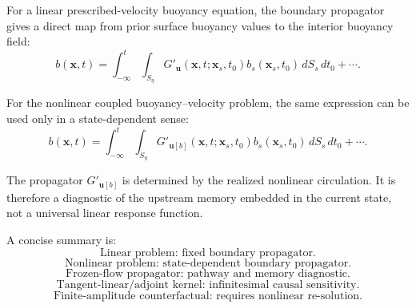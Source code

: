 \documentclass[10pt]{amsart}
\begin{document}
For a linear prescribed-velocity buoyancy equation, the boundary propagator gives a direct map from prior surface buoyancy values to the interior buoyancy field:
\begin{equation}
b(\mathbf x,t)
=
\int_{-\infty}^{t}\int_{S_\eta}
G'_{\mathbf u}(\mathbf x,t;\mathbf x_s,t_0)
b_s(\mathbf x_s,t_0)
\,dS_s\,dt_0
+\cdots.
\end{equation}

For the nonlinear coupled buoyancy--velocity problem, the same expression can be used only in a state-dependent sense:
\begin{equation}
b(\mathbf x,t)
=
\int_{-\infty}^{t}\int_{S_\eta}
G'_{\mathbf u[b]}(\mathbf x,t;\mathbf x_s,t_0)
b_s(\mathbf x_s,t_0)
\,dS_s\,dt_0
+\cdots.
\end{equation}

The propagator \(G'_{\mathbf u[b]}\) is determined by the realized nonlinear circulation. It is therefore a diagnostic of the upstream memory embedded in the current state, not a universal linear response function.

A concise summary is:
\[
\boxed{
\text{Linear problem: fixed boundary propagator.}
}
\]
\[
\boxed{
\text{Nonlinear problem: state-dependent boundary propagator.}
}
\]
\[
\boxed{
\text{Frozen-flow propagator: pathway and memory diagnostic.}
}
\]
\[
\boxed{
\text{Tangent-linear/adjoint kernel: infinitesimal causal sensitivity.}
}
\]
\[
\boxed{
\text{Finite-amplitude counterfactual: requires nonlinear re-solution.}
}
\]
\end{document}
